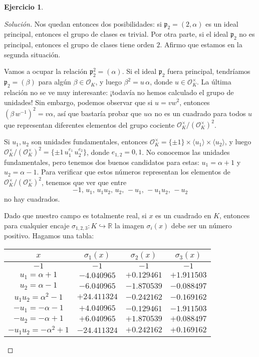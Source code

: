 \documentclass{article}
\theoremstyle{definition}
\newtheorem{ejercicio}{Ejercicio}
\newenvironment{solucion}{\begin{proof}[Solución]}{\end{proof}}
\newcommand{\RR}{\mathbb{R}}
\renewcommand{\O}{\mathcal{O}}
\begin{document}
\begin{ejercicio}
\begin{solucion}
    Nos quedan entonces dos posibilidades: si $\mathfrak{p}_2 = (2,\alpha)$
    es un ideal principal, entonces el grupo de clases es trivial. Por otra
    parte, si el ideal $\mathfrak{p}_2$ no es principal, entonces el grupo de
    clases tiene orden $2$. Afirmo que estamos en la segunda situación.

    Vamos a ocupar la relación $\mathfrak{p}_2^2 = (\alpha)$. Si el ideal
    $\mathfrak{p}_2$ fuera principal, tendríamos $\mathfrak{p}_2 = (\beta)$ para
    algún $\beta \in \O_K$, y luego $\beta^2 = u\,\alpha$, donde
    $u \in \O_K^\times$. La última relación no se ve muy interesante:
    ¡todavía no hemos calculado el grupo de unidades! Sin embargo, podemos
    observar que si $u = vw^2$, entonces $(\beta\,w^{-1})^2 = v\alpha$, así que
    bastaría probar que $u\alpha$ no es un cuadrado para todos $u$ que
    representan diferentes elementos del grupo cociente
    $\O_K^\times/(\O_K^\times)^2$.

    Si $u_1, u_2$ son unidades fundamentales, entonces
    $\O_K^\times = \{ \pm 1 \} \times \langle u_1\rangle \times \langle u_2\rangle$,
    y luego $\O_K^\times/(\O_K^\times)^2 = \{ \pm 1 \, u_1^{e_1} \, u_2^{e_2} \}$,
    donde $e_{1,2} = 0,1$. No conocemos las unidades fundamentales, pero tenemos
    dos buenos candidatos para estas: $u_1 = \alpha + 1$ y $u_2 = \alpha - 1$.
    Para verificar que estos números representan los elementos de
    $\O_K^\times/(\O_K^\times)^2$, tenemos que ver que entre
    $$-1, \, u_1, \, u_1 u_2, \, u_2, \, -u_1, \, -u_1 u_2, \, -u_2$$
    no hay cuadrados.

    Dado que nuestro campo es totalmente real, si $x$ es un cuadrado en $K$,
    entonces para cualquier encaje $\sigma_{1,2,3}\colon K \hookrightarrow \RR$
    la imagen $\sigma_i (x)$ debe ser un número positivo. Hagamos una tabla:

    \begin{center}
      \renewcommand{\arraystretch}{1.5}
      \begin{tabular}{cccc}
        \hline
        $x$ & $\sigma_1 (x)$ & $\sigma_2 (x)$ & $\sigma_3 (x)$ \\
        \hline
        $-1$ & $-1$ & $-1$ & $-1$ \\
        \hline
        $u_1 = \alpha + 1$  & $-4.040965$ & $+0.129461$ & $+1.911503$ \\
        \hline
        $u_2 = \alpha - 1$ & $-6.040965$ & $-1.870539$ & $-0.088497$ \\
        \hline
        $u_1 u_2 = \alpha^2 - 1$ & $+24.411324$ & $-0.242162$ & $-0.169162$ \\
        \hline
        $-u_1 = -\alpha - 1$ & $+4.040965$ & $-0.129461$ & $-1.911503$ \\
        \hline
        $-u_2 = -\alpha + 1$ & $+6.040965$ & $+1.870539$ & $+0.088497$ \\
        \hline
        $-u_1 u_2 = -\alpha^2 + 1$ & $-24.411324$ & $+0.242162$ & $+0.169162$ \\
        \hline
      \end{tabular}
    \end{center}


\end{solucion}
\end{ejercicio}
\end{document}
